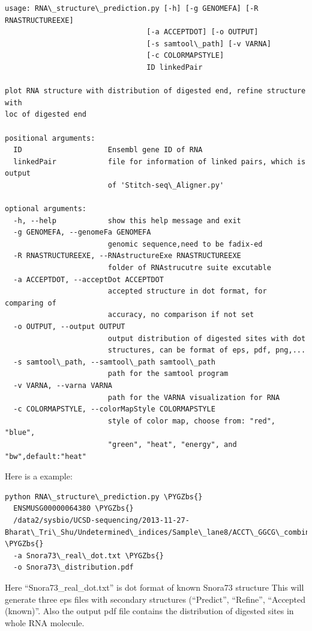 \documentclass[letterpaper,10pt,english]{sphinxmanual}
\def\PYGZbs{\char`\\}
\begin{document}
\begin{Verbatim}[commandchars=\\\{\}]
usage: RNA\_structure\_prediction.py [-h] [-g GENOMEFA] [-R RNASTRUCTUREEXE]
                                 [-a ACCEPTDOT] [-o OUTPUT]
                                 [-s samtool\_path] [-v VARNA]
                                 [-c COLORMAPSTYLE]
                                 ID linkedPair

plot RNA structure with distribution of digested end, refine structure with
loc of digested end

positional arguments:
  ID                    Ensembl gene ID of RNA
  linkedPair            file for information of linked pairs, which is output
                        of 'Stitch-seq\_Aligner.py'

optional arguments:
  -h, --help            show this help message and exit
  -g GENOMEFA, --genomeFa GENOMEFA
                        genomic sequence,need to be fadix-ed
  -R RNASTRUCTUREEXE, --RNAstructureExe RNASTRUCTUREEXE
                        folder of RNAstrucutre suite excutable
  -a ACCEPTDOT, --acceptDot ACCEPTDOT
                        accepted structure in dot format, for comparing of
                        accuracy, no comparison if not set
  -o OUTPUT, --output OUTPUT
                        output distribution of digested sites with dot
                        structures, can be format of eps, pdf, png,...
  -s samtool\_path, --samtool\_path samtool\_path
                        path for the samtool program
  -v VARNA, --varna VARNA
                        path for the VARNA visualization for RNA
  -c COLORMAPSTYLE, --colorMapStyle COLORMAPSTYLE
                        style of color map, choose from: "red", "blue",
                        "green", "heat", "energy", and "bw",default:"heat"
\end{Verbatim}

Here is a example:

\begin{Verbatim}[commandchars=\\\{\}]
python RNA\_structure\_prediction.py \PYGZbs{}
  ENSMUSG00000064380 \PYGZbs{}
  /data2/sysbio/UCSD-sequencing/2013-11-27-Bharat\_Tri\_Shu/Undetermined\_indices/Sample\_lane8/ACCT\_GGCG\_combine/ACCT\_GGCG\_fragment\_paired\_align\_selfLigation.txt \PYGZbs{}
  -a Snora73\_real\_dot.txt \PYGZbs{}
  -o Snora73\_distribution.pdf
\end{Verbatim}

Here ``Snora73\_real\_dot.txt'' is dot format of known Snora73 structure
This will generate three eps files with secondary structures (``Predict'', ``Refine'', ``Accepted (known)''. Also the output pdf file contains the distribution of digested sites in whole RNA molecule.
\end{document}
